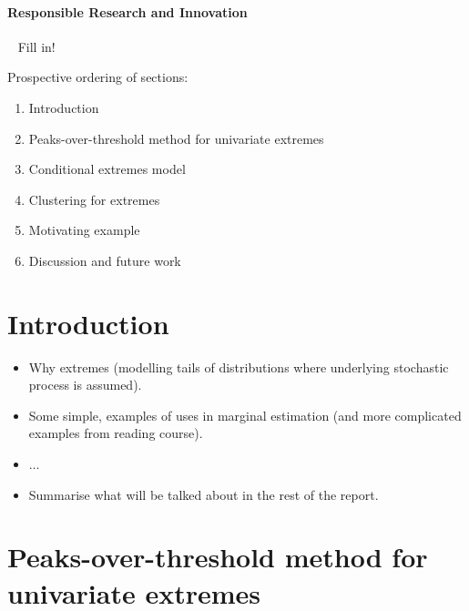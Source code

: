 \documentclass{article}
\numberwithin{equation}{section}
\begin{document}
\begin{center}
\paragraph{Responsible Research and Innovation} ~\linebreak
{}
Fill in!

\end{center}

\newpage

\tableofcontents

\newpage

Prospective ordering of sections:
\begin{enumerate}
  \item Introduction
  \item Peaks-over-threshold method for univariate extremes
  \item Conditional extremes model
  \item Clustering for extremes
  \item Motivating example
  \item Discussion and future work
\end{enumerate}

\section{Introduction}\label{sec:intro}


\begin{itemize}
  \item Why extremes (modelling tails of distributions where underlying stochastic process is assumed).
  \item Some simple, examples of uses in marginal estimation (and more complicated examples from reading course).
  \item $\ldots$
  \item Summarise what will be talked about in the rest of the report.
\end{itemize}

\section{Peaks-over-threshold method for univariate extremes}\label{sec:uni}
\end{document}
